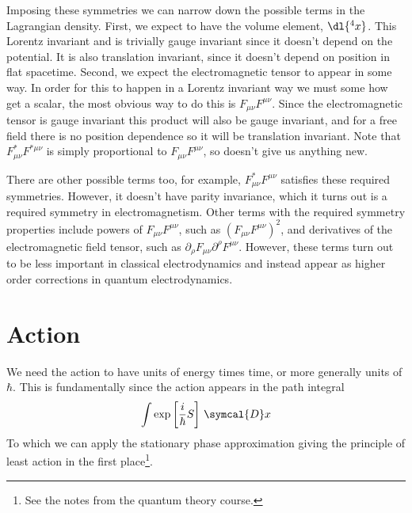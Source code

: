 \documentclass[fleqn]{NotesClass}
\begin{document}
    Imposing these symmetries we can narrow down the possible terms in the Lagrangian density.
    First, we expect to have the volume element, \(\dl{^4x}\).
    This Lorentz invariant and is trivially gauge invariant since it doesn't depend on the potential.
    It is also translation invariant, since it doesn't depend on position in flat spacetime.
    Second, we expect the electromagnetic tensor to appear in some way.
    In order for this to happen in a Lorentz invariant way we must some how get a scalar, the most obvious way to do this is \(F_{\mu\nu}F^{\mu\nu}\).
    Since the electromagnetic tensor is gauge invariant this product will also be gauge invariant, and for a free field there is no position dependence so it will be translation invariant.
    Note that \(F^{*}_{\mu\nu}F^{*\mu\nu}\) is simply proportional to \(F_{\mu\nu}F^{\mu\nu}\), so doesn't give us anything new.
    
    There are other possible terms too, for example, \(F^*_{\mu\nu}F^{\mu\nu}\) satisfies these required symmetries.
    However, it doesn't have parity invariance, which it turns out is a required symmetry in electromagnetism.
    Other terms with the required symmetry properties include powers of \(F_{\mu\nu}F^{\mu\nu}\), such as \((F_{\mu\nu}F^{\mu\nu})^2\), and derivatives of the electromagnetic field tensor, such as \(\partial_\rho F_{\mu\nu} \partial^\rho F^{\mu\nu}\).
    However, these terms turn out to be less important in classical electrodynamics and instead appear as higher order corrections in quantum electrodynamics.
    
    \section{Action}
    We need the action to have units of energy times time, or more generally units of \(\hbar\).
    This is fundamentally since the action appears in the path integral
    \begin{equation}
        \int \exp\left[ \frac{i}{\hbar}S \right] \, \symcal{D}x
    \end{equation}
    To which we can apply the stationary phase approximation giving the principle of least action in the first place\footnote{See the notes from the quantum theory course.}.
    
\end{document}
